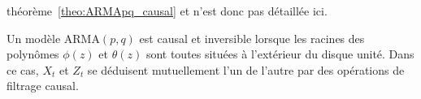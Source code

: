 th\'eor\`eme~\ref{theo:ARMApq_causal} et n'est donc pas d\'etaill\'ee ici.

Un mod\`ele ARMA$(p,q)$ est causal et inversible lorsque
les racines des polyn\^omes $\phi(z)$ et $\theta(z)$ sont toutes
situ\'ees \`a l'ext\'erieur du disque unit\'e. Dans ce cas, $X_t$ et $Z_t$
se d\'eduisent mutuellement l'un de l'autre par des op\'erations de
filtrage causal.

